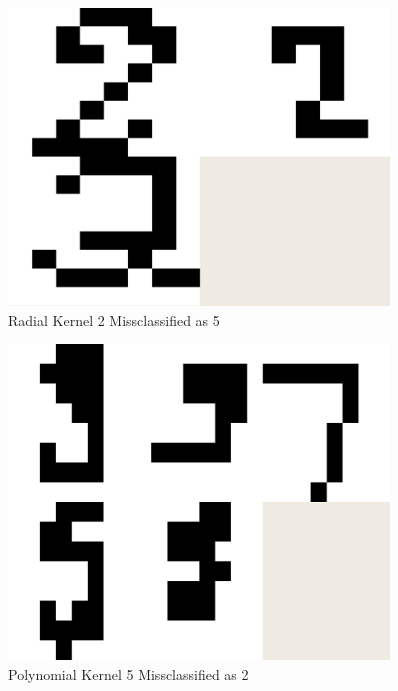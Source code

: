 \documentclass{article}
\begin{document}
\begin{figure}
\centering
\includegraphics[width=0.9\textwidth]{images/test2_5_correct2_class5_radial.png}
\caption{Radial Kernel 2 Missclassified as 5}
\label{radial2errortest}
\end{figure}

\begin{figure}
\centering
\includegraphics[width=0.9\textwidth]{images/test2_5_correct5_class2_a0156.png}
\caption{Polynomial Kernel 5 Missclassified as 2}
\label{poly5errortest}
\end{figure}
\end{document}
